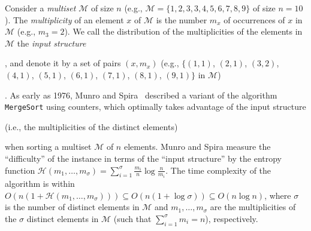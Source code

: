 \documentclass[10pt]{article}
\begin{document}
Consider a \emph{multiset} $\mathcal{M}$ of size $n$ (e.g.,
$\mathcal{M}=\{1,2,3,3,4,5,6,7,8,9\}$ of size $n=10$).
%
The \emph{multiplicity} of an element $x$ of $\mathcal{M}$ is the
number $m_x$ of occurrences of $x$ in $\mathcal{M}$ (e.g.,
  $m_3=2$). We call the distribution of the multiplicities
of the elements in $\mathcal{M}$ the \emph{input
  structure}\begin{LONG}
  , and denote it by a set of pairs $(x,m_x)$ (e.g., $\{(1,1)$,
  $(2,1)$, $(3,2)$, $(4,1)$, $(5,1)$, $(6,1)$, $(7,1)$, $(8,1)$,
  $(9,1)\}$ in $\mathcal{M}$)\end{LONG}.
%
As early as 1976, Munro and
Spira~\cite{1976-JComp-SortingAndSearchingInMultisets-MunroSpira}
described a variant of the algorithm {\tt{MergeSort}} using counters,
which optimally takes advantage of the input structure
\begin{LONG}
  (i.e., the multiplicities of the distinct elements)
\end{LONG}
when sorting a multiset $\mathcal{M}$ of $n$ elements. Munro and Spira
measure
the ``difficulty'' of the instance in terms of the ``input structure''
by the entropy function
$\mathcal{H}(m_1, \dots, m_\sigma) =
\sum_{i=1}^\sigma{\frac{m_i}{n}}\log{\frac{n}{m_i}}$. The time
complexity of the algorithm is within
$O(n(1 + \mathcal{H}(m_1, \dots, m_\sigma))) \subseteq
O(n(1{+}\log{\sigma})) \subseteq O(n\log{n})$, where $\sigma$ is the
number of distinct elements in $\mathcal{M}$ and
$m_1, \dots, m_\sigma$ are the multiplicities of the $\sigma$ distinct
elements in $\mathcal{M}$ (such that $\sum_{i=1}^\sigma {m_i}=n$),
respectively.
\end{document}
